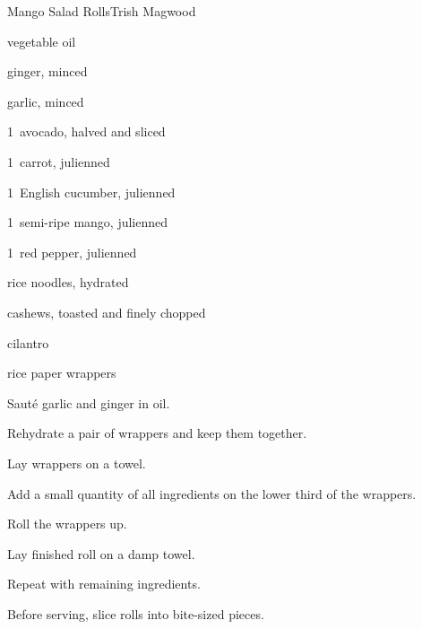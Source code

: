 \begin{recipe}{Mango Salad Rolls}{Trish Magwood}{}

\begin{ingredients}
\item {} vegetable oil
\item {} ginger, minced
\item {} garlic, minced
\item 1~avocado, halved and sliced
\item 1~carrot, julienned
\item 1~English cucumber, julienned
\item 1~semi-ripe mango, julienned
\item 1~red pepper, julienned
\item {} rice noodles, hydrated
\item \C{\half} cashews, toasted and finely chopped
\item cilantro
\item rice paper wrappers
\end{ingredients}

\begin{directions}
\item Saut\'e garlic and ginger in oil.
\item Rehydrate a pair of wrappers and keep them together.
\item Lay wrappers on a towel.
\item Add a small quantity of all ingredients on the lower third of the wrappers.
\item Roll the wrappers up.
\item Lay finished roll on a damp towel.
\item Repeat with remaining ingredients.
\item Before serving, slice rolls into bite-sized pieces.
\end{directions}

\end{recipe}
